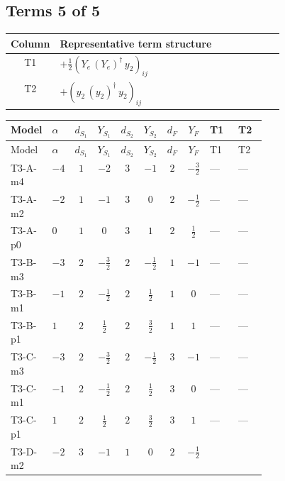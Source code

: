 \documentclass[8pt]{article}
\begin{document}
\begin{landscape}
\subsection*{Terms 5 of 5}
\begin{center}
\begin{tabular}{@{}c >{\raggedright\arraybackslash}p{0.82\linewidth}@{}}
\toprule
Column & Representative term structure \\
\midrule
T1 & \(\displaystyle +\frac{1}{2} \left({Y_e}\,\left({Y_e}\right)^{\dagger}\,{y_2}\right)_{ij}\) \\
\midrule
T2 & \(\displaystyle +\left({y_2}\,\left({y_2}\right)^{\dagger}\,{y_2}\right)_{ij}\) \\
\midrule
\bottomrule
\end{tabular}
\end{center}
\smallskip
\tiny
\begin{longtable}{@{}llcccccc >{\raggedright\arraybackslash}p{0.21\linewidth} >{\raggedright\arraybackslash}p{0.21\linewidth}@{}}
\toprule
Model & $\alpha$ & $d_{S_1}$ & $Y_{S_1}$ & $d_{S_2}$ & $Y_{S_2}$ & $d_F$ & $Y_F$ & T1 & T2 \\
\midrule
\endfirsthead
\toprule
Model & $\alpha$ & $d_{S_1}$ & $Y_{S_1}$ & $d_{S_2}$ & $Y_{S_2}$ & $d_F$ & $Y_F$ & T1 & T2 \\
\midrule
\endhead
T3-A-m4 & $-4$ & $1$ & $-2$ & $3$ & $-1$ & $2$ & $-\frac{3}{2}$ & --- & --- \\
\midrule
T3-A-m2 & $-2$ & $1$ & $-1$ & $3$ & $0$ & $2$ & $-\frac{1}{2}$ & --- & --- \\
\midrule
T3-A-p0 & $0$ & $1$ & $0$ & $3$ & $1$ & $2$ & $\frac{1}{2}$ & --- & --- \\
\midrule
T3-B-m3 & $-3$ & $2$ & $-\frac{3}{2}$ & $2$ & $-\frac{1}{2}$ & $1$ & $-1$ & --- & --- \\
\midrule
T3-B-m1 & $-1$ & $2$ & $-\frac{1}{2}$ & $2$ & $\frac{1}{2}$ & $1$ & $0$ & --- & --- \\
\midrule
T3-B-p1 & $1$ & $2$ & $\frac{1}{2}$ & $2$ & $\frac{3}{2}$ & $1$ & $1$ & --- & --- \\
\midrule
T3-C-m3 & $-3$ & $2$ & $-\frac{3}{2}$ & $2$ & $-\frac{1}{2}$ & $3$ & $-1$ & --- & --- \\
\midrule
T3-C-m1 & $-1$ & $2$ & $-\frac{1}{2}$ & $2$ & $\frac{1}{2}$ & $3$ & $0$ & --- & --- \\
\midrule
T3-C-p1 & $1$ & $2$ & $\frac{1}{2}$ & $2$ & $\frac{3}{2}$ & $3$ & $1$ & --- & --- \\
\midrule
T3-D-m2 & $-2$ & $3$ & $-1$ & $1$ & $0$ & $2$ & $-\frac{1}{2}$ & \scriptsize\adjustbox{max width=\linewidth}{$\begin{gathered} +\frac{1}{2} \left({Y_e}\,\left({Y_e}\right)^{\dagger}\,{y_2}\right)_{ij}\end{gathered}$} & \scriptsize\adjustbox{max width=\linewidth}{$\begin{gathered} +\left({y_2}\,\left({y_2}\right)^{\dagger}\,{y_2}\right)_{ij}\end{gathered}$} \\

\end{longtable}
\end{landscape}
\end{document}
